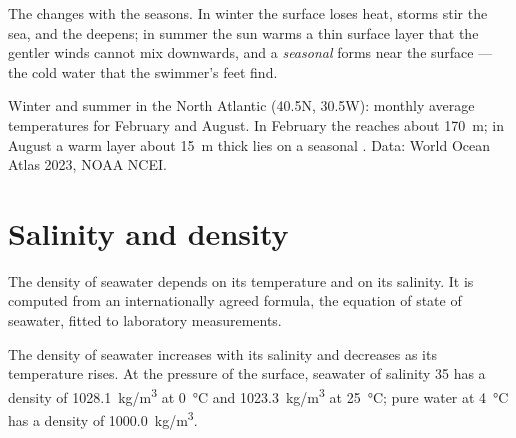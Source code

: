 The  changes with the seasons. In winter the surface loses heat,
storms stir the sea, and the  deepens; in summer the sun warms a
thin surface layer that the gentler winds cannot mix downwards, and a
\emph{seasonal } forms near the surface --- the cold water that
the swimmer's feet find.

\begin{omfigure}

{\small Winter and summer in the North Atlantic (40.5\textdegree N,
30.5\textdegree W): monthly average temperatures for February and August.
In February the  reaches about \qty{170}{m}; in August a warm
layer about \qty{15}{m} thick lies on a seasonal . Data: World
Ocean Atlas 2023, NOAA NCEI.}
\end{omfigure}

\section{Salinity and density}

The density of seawater depends on its temperature and on its salinity. It
is computed from an internationally agreed formula, the equation of state of
seawater, fitted to laboratory measurements.

\begin{proposition}\label{prop:g10:layered-ocean:density}
The density of seawater increases with its salinity and decreases as its
temperature rises. At the pressure of the surface, seawater of salinity 35
has a density of \qty{1028.1}{kg/m^3} at \qty{0}{\degreeCelsius} and
\qty{1023.3}{kg/m^3} at \qty{25}{\degreeCelsius}; pure water at
\qty{4}{\degreeCelsius} has a density of \qty{1000.0}{kg/m^3}.
\end{proposition}


